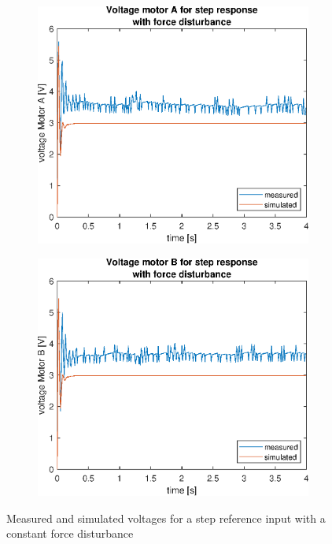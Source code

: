 \documentclass[a4paper,kul]{kulakarticle} %
\begin{document}
\begin{figure}[htp!]
	\centering
	\begin{subfigure}[b]{0.49\textwidth}
		\centering
		\includegraphics[width=\linewidth]{comparison_voltage_stepresponseA_FD.eps}
		
	\end{subfigure}
	\hfill
	\begin{subfigure}[b]{0.49\textwidth}  
		\centering
		\includegraphics[width=\linewidth]{comparison_voltage_stepresponseB_FD.eps}
		
	\end{subfigure}
	\caption{Measured and simulated voltages for a step reference input with a constant force disturbance}
	\label{fig:voltagestepresponseFD}
\end{figure}



\newpage


\end{document}
